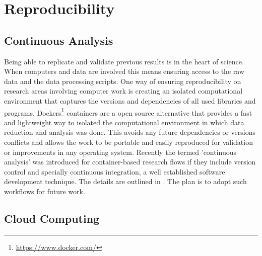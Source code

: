 

\section{Reproducibility}


\subsection{Continuous Analysis}


Being able to replicate and validate previous results is in the heart of science. When computers and data are involved this means ensuring access to the raw data and the data processing scripts. One way of ensuring reproducibility on research areas involving computer work is creating an isolated computational environment that captures the versions and dependencies of all used libraries and programs. Dockers\footnote{\url{https://www.docker.com/}} containers are a open source alternative that provides a fast and lightweight way to isolated the computational environment in which data reduction and analysis was done. This  avoids any future dependencies or versions conflicts and allows the work to be portable and easily reproduced for validation or improvements in any operating system. Recently the termed 'continuous analysis' was introduced for container-based research flows if they include version control and specially continuous integration, a well established software development technique. The details are outlined in \cite{Beaulieu-Jones056473}. The plan is to adopt such workflows for future work.  

\subsection{Cloud Computing}

